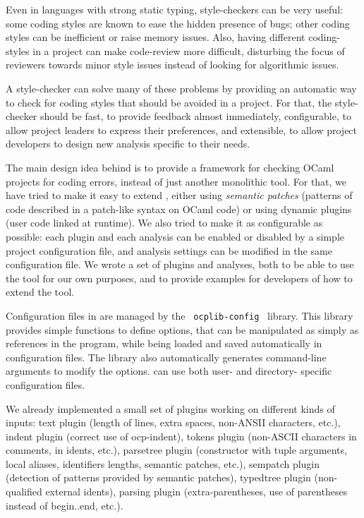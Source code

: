 Even in languages with strong static typing, style-checkers can be
very useful: some coding styles are known to ease the hidden presence
of bugs; other coding styles can be inefficient or raise memory
issues. Also, having different coding-styles in a project can make
code-review more difficult, disturbing the focus of reviewers towards
minor style issues instead of looking for algorithmic issues.

A style-checker can solve many of these problems by providing an
automatic way to check for coding styles that should be avoided in a
project. For that, the style-checker should be fast, to provide
feedback almost immediately, configurable, to allow project leaders to
express their preferences, and extensible, to allow project developers
to design new analysis specific to their needs.

The main design idea behind \ocplint{} is to provide a framework for
checking OCaml projects for coding errors, instead of just another
monolithic tool. For that, we have tried to make it easy to
extend \ocplint{}, either using \emph{semantic patches} (patterns of
code described in a patch-like syntax on OCaml code) or using dynamic
plugins (user code linked at runtime). We also tried to make it as
configurable as possible: each plugin and each analysis can be enabled
or disabled by a simple project configuration file, and analysis
settings can be modified in the same configuration file. We wrote a
set of plugins and analyses, both to be able to use the tool for our
own purposes, and to provide examples for developers of how to extend
the tool.

Configuration files in \ocplint{} are managed by the {\tt
ocplib-config}~\cite{ocplib-config} library. This library provides
simple functions to define options, that can be manipulated as simply
as references in the program, while being loaded and saved
automatically in configuration files. The library also automatically
generates command-line arguments to modify the options. \ocplint{} can
use both user- and directory- specific configuration files.

We already implemented a small set of plugins working on different
kinds of inputs: {\sf text} plugin (length of lines, extra spaces,
non-ANSII characters, etc.), {\sf indent} plugin (correct use of {\sf
ocp-indent}), {\sf tokens} plugin (non-ASCII characters in comments,
in idents, etc.), {\sf parsetree} plugin (constructor with tuple
arguments, local aliases, identifiers lengths, semantic patches,
etc.), {\sf sempatch} plugin (detection of patterns provided by
semantic patches), {\sf typedtree} plugin (non-qualified external
idents), {\sf parsing} plugin (extra-parentheses, use of parentheses instead of
 {\sf begin..end}, etc.).
 

